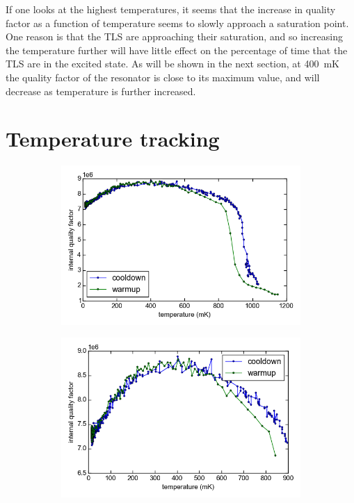If one looks at the highest temperatures, it seems that the increase in quality factor as a function of temperature seems to slowly approach a saturation point. One reason is that the TLS are approaching their saturation, and so increasing the temperature further will have little effect on the percentage of time that the TLS are in the excited state. As will be shown in the next section, at \SI{400}{\milli \kelvin} the quality factor of the resonator is close to its maximum value, and will decrease as temperature is further increased.



\section{Temperature tracking}
\label{resonator:results:temperature_tracking}
\begin{figure}[h]
    \centering
    \begin{subfigure}[b]{.49\textwidth}
        \label{fig:temperature_tracking_Qi_drop}
        \includegraphics[width=\textwidth]{Figures/DRIE/Temperature tracking drop - Qi vs T.png}
    \end{subfigure}
    \begin{subfigure}[b]{.49\textwidth}
        \label{fig:temperature_tracking_Qi_nodrop}
        \includegraphics[width=\textwidth]{Figures/DRIE/Temperature tracking - no drop - Qi vs T.png}

\end{subfigure}
\end{figure}
